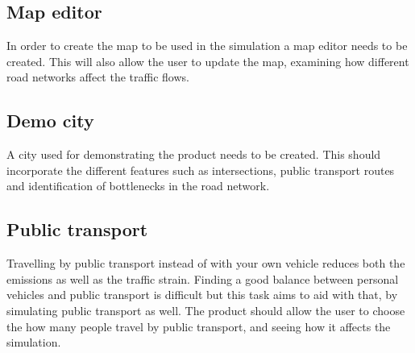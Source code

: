 \subsection{Map editor}
    In order to create the map to be used in the simulation a map editor needs to be created. This will also allow the user to update the map, examining how different road networks affect the traffic flows.

\subsection{Demo city}
    A city used for demonstrating the product needs to be created. This should incorporate the different features such as intersections, public transport routes and identification of bottlenecks in the road network.

\subsection{Public transport}
    Travelling by public transport instead of with your own vehicle reduces both the emissions as well as the traffic strain. Finding a good balance between personal vehicles and public transport is difficult but this task aims to aid with that, by simulating public transport as well. The product should allow the user to choose the how many people travel by public transport, and seeing how it affects the simulation.